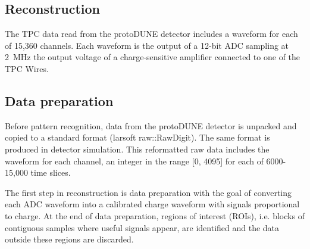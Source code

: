 \subsection{Reconstruction}

The TPC data read from the protoDUNE detector includes a waveform for
each of 15,360 channels. Each waveform is the output of a 12-bit ADC sampling
at 2~MHz the output voltage of a charge-sensitive amplifier connected to one of
the TPC Wires. 
\subsection{Data preparation}

Before pattern recognition, data from the protoDUNE detector is
unpacked and copied to a standard format (larsoft raw::RawDigit).
The same format is produced in detector simulation.
This reformatted raw data includes the waveform for each channel, an
integer in the range [0, 4095] for each of 6000-15,000 time slices. 

The first step in reconstruction is data preparation with the goal of
converting each ADC waveform into a calibrated charge waveform with
signals proportional to charge. At the end of data preparation, regions of interest (ROIs), i.e. blocks of contiguous samples where
useful signals appear, are identified and the data outside these regions are discarded.


